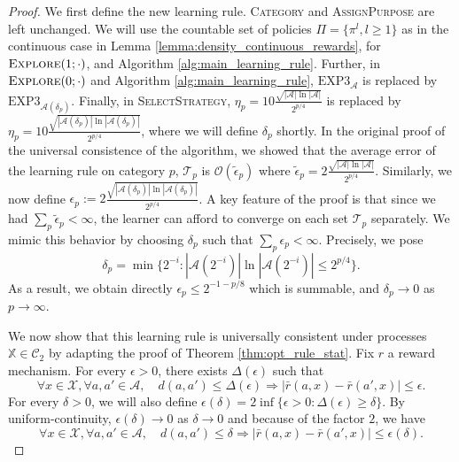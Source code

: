 \documentclass[aos]{imsart}
\theoremstyle{plain}
\theoremstyle{remark}
\newcommand{\Acal}{\mathcal{A}}
\newcommand{\Ccal}{\mathcal{C}}
\newcommand{\Tcal}{\mathcal{T}}
\newcommand{\Xcal}{\mathcal{X}}
\newcommand{\Ocal}{\mathcal{O}}
\newcommand{\Xbb}{\mathbb{X}}
\newcommand{\1}{\mathbbm{1}}%
\newcommand{\EXP}{\mathrm{EXP3}}
\begin{document}
\begin{proof}
We first define the new learning rule. \textsc{Category} and \textsc{AssignPurpose} are left unchanged. We will use the countable set of policies $\Pi=\{\pi^l,l\geq 1\}$ as in the continuous case in Lemma \ref{lemma:density_continuous_rewards}, for $\textsc{Explore}(1;\cdot)$, and Algorithm \ref{alg:main_learning_rule}. Further, in $\textsc{Explore}(0;\cdot)$ and Algorithm \ref{alg:main_learning_rule}, $\EXP_\Acal$ is replaced by $\EXP_{\Acal(\delta_p)}$. Finally, in \textsc{SelectStrategy}, $\eta_p = 10\frac{\sqrt{|\Acal|\ln |\Acal|}}{2^{p/4}}$ is replaced by $\eta_p = 10\frac{\sqrt{|\Acal(\delta_p)|\ln |\Acal(\delta_p)|}}{2^{p/4}}$, where we will define $\delta_p$ shortly. In the original proof of the universal consistence of the algorithm, we showed that the average error of the learning rule on category $p$, $\Tcal_p$ is $\Ocal(\tilde \epsilon_p)$ where $\tilde \epsilon_p=2\frac{\sqrt{|\Acal|\ln|\Acal|}}{2^{p/4}}$. Similarly, we now define $\epsilon_p:=2\frac{\sqrt{|\Acal(\delta_p)|\ln |\Acal(\delta_p)|}}{2^{p/4}}$. A key feature of the proof is that since we had $\sum_p \tilde \epsilon_p<\infty$, the learner can afford to converge on each set $\Tcal_p$ separately. We mimic this behavior by choosing $\delta_p$ such that $\sum_p \epsilon_p<\infty$. Precisely, we pose
\begin{equation*}
    \delta_p = \min\{2^{-i}: |\Acal(2^{-i})|\ln|\Acal(2^{-i})|\leq 2^{p/4}\}.
\end{equation*}
As a result, we obtain directly $\epsilon_p\leq 2^{-1-p/8}$ which is summable, and $\delta_p\to 0$ as $p\to\infty$.

We now show that this learning rule is universally consistent under processes $\Xbb\in\Ccal_2$ by adapting the proof of Theorem \ref{thm:opt_rule_stat}. Fix $r$ a reward mechanism. For every $\epsilon>0$, there exists $\Delta(\epsilon)$ such that
\begin{equation*}
    \forall x\in\Xcal,\forall a,a'\in\Acal,\quad d(a,a')\leq \Delta(\epsilon)\Rightarrow |\bar r(a, x)-\bar r(a', x)| \leq \epsilon.
\end{equation*}
For every $\delta>0$, we will also define $\epsilon(\delta)=2\inf \{\epsilon>0: \Delta(\epsilon)\geq \delta\}$. By uniform-continuity, $\epsilon(\delta)\to 0$ as $\delta\to 0$ and because of the factor $2$, we have
\begin{equation*}
    \forall x\in\Xcal,\forall a,a'\in\Acal,\quad d(a,a')\leq \delta \Rightarrow |\bar r(a, x)-\bar r(a', x)| \leq \epsilon(\delta).
\end{equation*}




\end{proof}
\end{document}
